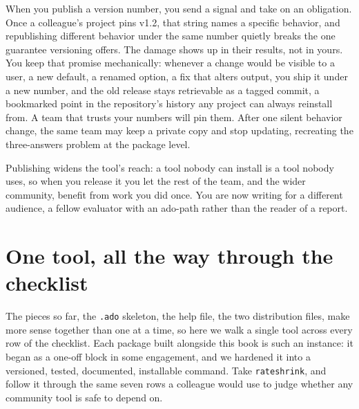 \documentclass[
    a4paper,
    fontsize=10pt,
    twoside=true,
    numbers=noenddot,
]{kaobook}
\begin{document}
When you publish a version number, you send a signal and take on an obligation. Once a colleague's project pins v1.2, that string names a specific behavior, and republishing different behavior under the same number quietly breaks the one guarantee versioning offers. The damage shows up in their results, not in yours. You keep that promise mechanically: whenever a change would be visible to a user, a new default, a renamed option, a fix that alters output, you ship it under a new number, and the old release stays retrievable as a tagged commit, a bookmarked point in the repository's history any project can always reinstall from. A team that trusts your numbers will pin them. After one silent behavior change, the same team may keep a private copy and stop updating, recreating the three-answers problem at the package level.

Publishing widens the tool's reach: a tool nobody can install is a tool nobody uses, so when you release it you let the rest of the team, and the wider community, benefit from work you did once. You are now writing for a different audience, a fellow evaluator with an ado-path rather than the reader of a report.

\section{One tool, all the way through the checklist}\label{sec:rateshrink-walk}
The pieces so far, the \texttt{.ado} skeleton, the help file, the two distribution files, make more sense together than one at a time, so here we walk a single tool across every row of the checklist. Each package built alongside this book is such an instance: it began as a one-off block in some engagement, and we hardened it into a versioned, tested, documented, installable command. Take \texttt{rateshrink}, and follow it through the same seven rows a colleague would use to judge whether any community tool is safe to depend on.
\end{document}
